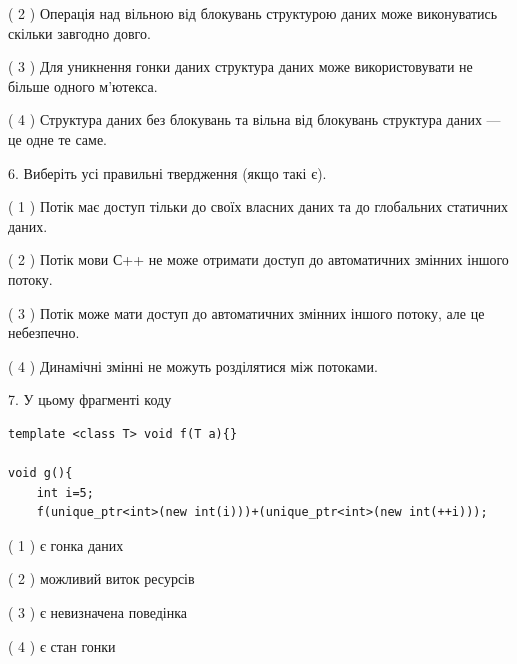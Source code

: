\documentclass[12pt, ukrainian]{article}
\begin{document}
\begin {large}
{( 2 ) Операція над вільною від блокувань структурою даних може виконуватись скільки завгодно довго.%

( 3 ) Для уникнення гонки даних структура даних може використовувати не більше одного м’ютекса.%

( 4 ) Структура даних без блокувань та вільна від блокувань структура даних --- це одне те саме.%
\newpage



\vspace{5mm}
6. Виберіть усі правильні твердження (якщо такі є).\par
\vspace{2mm}

( 1 ) Потік має доступ тільки до своїх власних даних та до глобальних статичних даних.%

( 2 ) Потік мови С++ не може отримати доступ до автоматичних змінних іншого потоку.%

( 3 ) Потік може мати доступ до автоматичних змінних іншого потоку, але це небезпечно.%

( 4 ) Динамічні змінні не можуть розділятися між потоками.%


\vspace{5mm}
7. У цьому фрагменті коду
\begin{verbatim}
template <class T> void f(T a){}

void g(){
    int i=5;
    f(unique_ptr<int>(new int(i)))+(unique_ptr<int>(new int(++i)));
\end{verbatim}
( 1 ) є гонка даних%

( 2 ) можливий виток ресурсів%

( 3 ) є невизначена поведінка%

( 4 ) є стан гонки%
}
\end {large}
\end{document}
